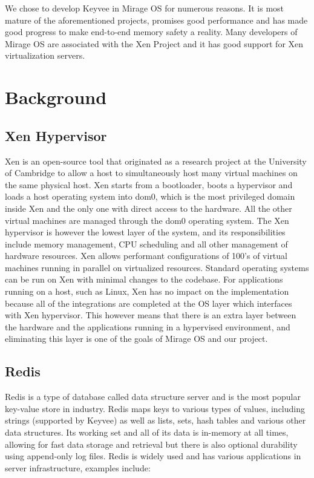 \documentclass[english,10pt,twocolumn]{article}
\begin{document}
We chose to develop Keyvee in Mirage OS for numerous reasons.
It is most mature of the aforementioned projects, promises good performance and has made good progress to make end-to-end memory safety a reality.
Many developers of Mirage OS are associated with the Xen Project and it has good support for Xen virtualization servers.


\section{Background}


\subsection{Xen Hypervisor}

Xen is an open-source tool that originated as a research project at the University of Cambridge to allow a host to simultaneously host many virtual machines on the same physical host.
Xen starts from a bootloader, boots a hypervisor and loads a host operating system into dom0, which is the most privileged domain inside Xen and the only one with direct access to the hardware.
All the other virtual machines are managed through the dom0 operating system.
The Xen hypervisor is however the lowest layer of the system, and its responsibilities include memory management, CPU scheduling and all other management of hardware resources.
Xen allows performant configurations of 100's of virtual machines running in parallel on virtualized resources.
Standard operating systems can be run on Xen with minimal changes to the codebase.
For applications running on a host, such as Linux, Xen has no impact on the implementation because all of the integrations are completed at the OS layer which interfaces with Xen hypervisor.
This however means that there is an extra layer between the hardware and the applications running in a hypervised environment, and eliminating this layer is one of the goals of Mirage OS and our project.


\subsection{Redis}

Redis is a type of database called data structure server and is the most popular key-value store in industry\cite{dbengines}.
Redis maps keys to various types of values, including strings (supported by Keyvee) as well as lists, sets, hash tables and various other data structures.
Its working set and all of its data is in-memory at all times, allowing for fast data storage and retrieval but there is also optional durability using append-only log files.
Redis is widely used and has various applications in server infrastructure, examples include:
\end{document}
